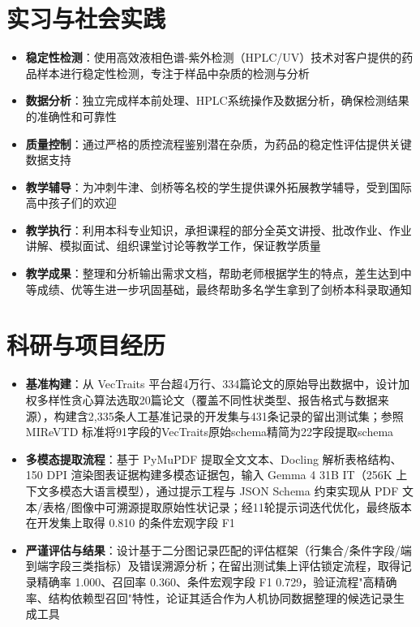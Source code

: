 \documentclass{my-resume}
\begin{document}
\section{实习与社会实践}
\begin{itemize}[parsep=0.2ex]
  \item \textbf{稳定性检测}：使用高效液相色谱-紫外检测（HPLC/UV）技术对客户提供的药品样本进行稳定性检测，专注于样品中杂质的检测与分析
  \item \textbf{数据分析}：独立完成样本前处理、HPLC系统操作及数据分析，确保检测结果的准确性和可靠性
  \item \textbf{质量控制}：通过严格的质控流程鉴别潜在杂质，为药品的稳定性评估提供关键数据支持
\end{itemize}
\begin{itemize}[parsep=0.2ex]
  \item \textbf{教学辅导}：为冲刺牛津、剑桥等名校的学生提供课外拓展教学辅导，受到国际高中孩子们的欢迎
  \item \textbf{教学执行}：利用本科专业知识，承担课程的部分全英文讲授、批改作业、作业讲解、模拟面试、组织课堂讨论等教学工作，保证教学质量
  \item \textbf{教学成果}：整理和分析输出需求文档，帮助老师根据学生的特点，差生达到中等成绩、优等生进一步巩固基础，最终帮助多名学生拿到了剑桥本科录取通知
\end{itemize}

\section{科研与项目经历}

\begin{itemize}[parsep=0.2ex]
  \item \textbf{基准构建}：从 VecTraits 平台超4万行、334篇论文的原始导出数据中，设计加权多样性贪心算法选取20篇论文（覆盖不同性状类型、报告格式与数据来源），构建含2,335条人工基准记录的开发集与431条记录的留出测试集；参照 MIReVTD 标准将91字段的VecTraits原始schema精简为22字段提取schema
  \item \textbf{多模态提取流程}：基于 PyMuPDF 提取全文文本、Docling 解析表格结构、150 DPI 渲染图表证据构建多模态证据包，输入 Gemma 4 31B IT（256K 上下文多模态大语言模型），通过提示工程与 JSON Schema 约束实现从 PDF 文本/表格/图像中可溯源提取原始性状记录；经11轮提示词迭代优化，最终版本在开发集上取得 0.810 的条件宏观字段 F1
  \item \textbf{严谨评估与结果}：设计基于二分图记录匹配的评估框架（行集合/条件字段/端到端字段三类指标）及错误溯源分析；在留出测试集上评估锁定流程，取得记录精确率 1.000、召回率 0.360、条件宏观字段 F1 0.729，验证流程"高精确率、结构依赖型召回"特性，论证其适合作为人机协同数据整理的候选记录生成工具
\end{itemize}
\end{document}
